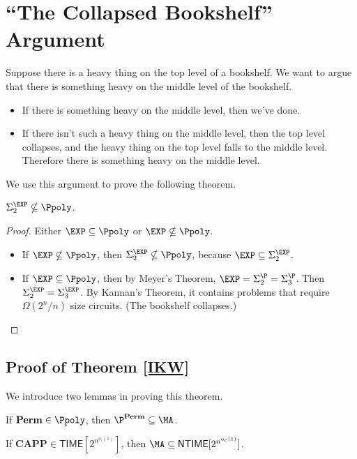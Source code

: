 \documentclass[letterpaper, 12pt]{article}
\newcommand{\Perm}{\mathbf{Perm}}
\newcommand{\CAPP}{\mathbf{CAPP}}
\newcommand{\Time}[1]{\mathsf{TIME}[#1]}
\newcommand{\NTime}[1]{\mathsf{NTIME}[#1]}
\begin{document}
\section{``The Collapsed Bookshelf'' Argument}

Suppose there is a heavy thing on the top level of a bookshelf. We want to argue that there is something heavy on the middle level of the bookshelf.
\begin{itemize}
	\item If there is something heavy on the middle level, then we've done.
	\item If there isn't such a heavy thing on the middle level, then the top level collapses, and the heavy thing on the top level falls to the middle level. Therefore there is something heavy on the middle level.
\end{itemize}

We use this argument to prove the following theorem.

\begin{theorem}
	$\Sigma_2^\EXP \nsubseteq \Ppoly$.
\end{theorem}

\begin{proof}
	Either $\EXP \subseteq \Ppoly$ or $\EXP \nsubseteq \Ppoly$.
	\begin{itemize}
		\item If $\EXP \nsubseteq \Ppoly$, then $\Sigma_2^\EXP \nsubseteq \Ppoly$, because $\EXP \subseteq \Sigma_2^\EXP$.
		\item If $\EXP \subseteq \Ppoly$, then by Meyer's Theorem, $\EXP = \Sigma_2^\P = \Sigma_3^\P$. Then $\Sigma_2^\EXP = \Sigma_3^\EXP$. By Kannan's Theorem, it contains problems that require $\Omega(2^n/n)$ size circuits. (The bookshelf collapses.)
	\end{itemize}
\end{proof}

\subsection{Proof of Theorem \ref{IKW}} %

We introduce two lemmas in proving this theorem.

\begin{lemma} \label{lemma1}
	If $\Perm \in \Ppoly$, then $\P^\Perm \subseteq \MA$.
\end{lemma}

\begin{lemma} \label{lemma2}
	If $\CAPP \in \Time{2^{n^{o_c(1)}}}$, then $\MA \subseteq \NTime{2^{n^{o_c(1)}}}$.
\end{lemma}
\end{document}

